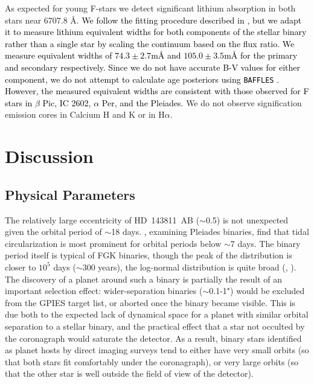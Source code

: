 \documentclass[]{aastex701} %
\begin{document}
As expected for young F-stars we detect significant lithium absorption in both stars near 6707.8 \r{A}. \textcolor{black}{We follow the fitting procedure described in \cite{Peck2025}, but we adapt it to measure lithium equivalent widths for both components of the stellar binary rather than a single star by scaling the continuum based on the flux ratio. We measure equivalent widths of $74.3\pm2.7$m\r{A} and $105.0\pm3.5$m\r{A} for the primary and secondary respectively. Since we do not have accurate B-V values for either component, we do not attempt to calculate age posteriors using \texttt{BAFFLES} \citep{BAFFLES}. However, the measured equivalent widths are consistent with those observed for F stars in $\beta$ Pic, IC 2602, $\alpha$ Per, and the Pleiades.} We do not observe signification emission cores in Calcium H and K or in H$\alpha$.








\section{Discussion}

\subsection{Physical Parameters}

The relatively large eccentricity of HD~143811~AB ($\sim$0.5) is not unexpected given the orbital period of $\sim$18 days. \citet{torres:2021}, examining Pleiades binaries, find that tidal circularization is most prominent for orbital periods below $\sim$7 days. The binary period itself is typical of FGK binaries, though the peak of the distribution is closer to $10^5$ days ($\sim$300 years), the log-normal distribution is quite broad (\citealt{Duquennoy:1991}, \citealt{Raghavan:2010}). The discovery of a planet around such a binary is partially the result of an important selection effect: wider-separation binaries ($\sim$0.1-1") would be excluded from the GPIES target list, or aborted once the binary became visible. This is due both to the expected lack of dynamical space for a planet with similar orbital separation to a stellar binary, and the practical effect that a star not occulted by the coronagraph would saturate the detector. As a result, binary stars identified as planet hosts by direct imaging surveys tend to either have very small orbits (so that both stars fit comfortably under the coronagraph), or very large orbits (so that the other star is well outside the field of view of the detector).
\end{document}
